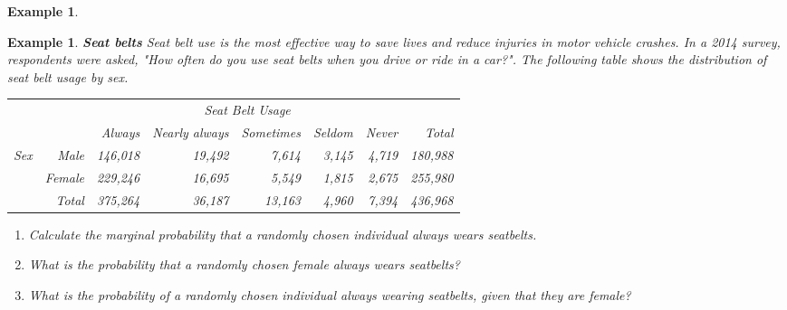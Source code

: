 \documentclass[12pt]{amsart}
\newtheorem{example}[theorem]{Example}
\begin{document}
{\begin{example}
\end{example} 


\newpage
\begin{example}\textbf{Seat belts} \newline
Seat belt use is the most effective way to save lives and reduce injuries in motor vehicle crashes. In a 2014 survey, respondents were asked, "How often do you use seat belts when you drive or ride in a car?". The following table shows the distribution of seat belt usage by sex.
\vspace{.2cm}
\begin{center}
		\begin{tabular}{rrrrrrrr}
			& &  \multicolumn{5}{c}{\textit{Seat Belt Usage}} &  \\ 
			\cline{3-7}
			&       & Always & Nearly always & Sometimes    & Seldom     & Never  & Total \\ 
			\cline{2-8}
			\textit{Sex}    & Male    & 146,018   & 19,492    & 7,614   &  3,145  & 4,719 & 180,988 \\ 
			& Female   & 229,246    & 16,695    & 5,549    & 1,815  & 2,675 &  255,980 \\ 
			\cline{2-8}
			& Total & 375,264    & 36,187    & 13,163    & 4,960   & 7,394  &  436,968
		\end{tabular}
\end{center}
\vspace{.2cm}

\begin{enumerate}
\item Calculate the marginal probability that a randomly chosen individual always wears seatbelts.

\vspace{3cm}

\item What is the probability that a randomly chosen female always wears seatbelts?


\vspace{3cm}

\item What is the probability of a randomly chosen individual always wearing seatbelts, given that they are female? 


\end{enumerate}
\end{example}}
\end{document}
